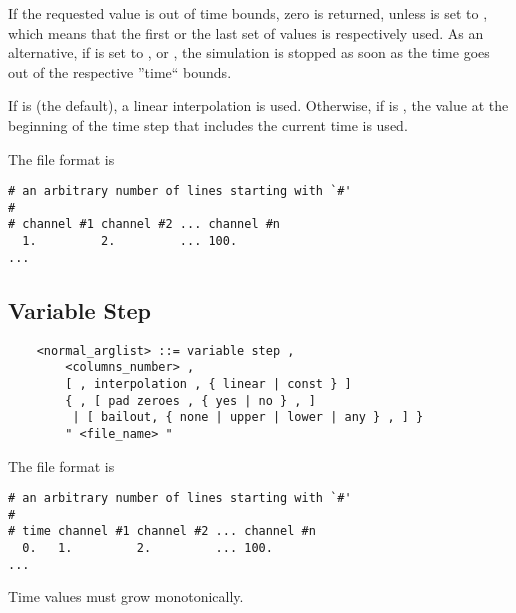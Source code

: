 If the requested value is out of time bounds, zero is returned,
unless  is set to , which means that the first
or the last set of values is respectively used.
As an alternative, if  is set to , 
or , the simulation is stopped as soon as the time goes out
of the respective ''time`` bounds.

If  is  (the default), a linear interpolation
is used.
Otherwise, if  is , the value at the beginning
of the time step that includes the current time is used.

The file format is
\begin{verbatim}
# an arbitrary number of lines starting with `#'
#
# channel #1 channel #2 ... channel #n
  1.         2.         ... 100.
...
\end{verbatim}

\subsection{Variable Step}
\begin{verbatim}
    <normal_arglist> ::= variable step , 
        <columns_number> ,
        [ , interpolation , { linear | const } ]
        { , [ pad zeroes , { yes | no } , ]
         | [ bailout, { none | upper | lower | any } , ] }
        " <file_name> "
\end{verbatim}

The file format is
\begin{verbatim}
# an arbitrary number of lines starting with `#'
#
# time channel #1 channel #2 ... channel #n
  0.   1.         2.         ... 100.
...
\end{verbatim}
Time values must grow monotonically.


